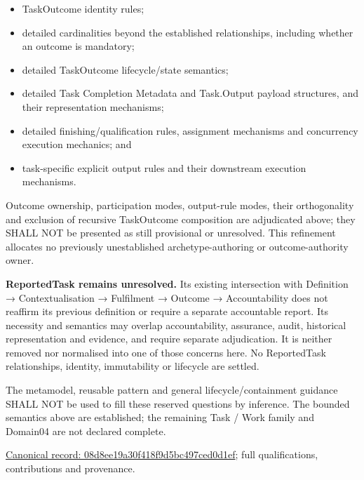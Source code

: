 \begin{itemize}


\item TaskOutcome identity rules;

\item detailed cardinalities beyond the established relationships, including
  whether an outcome is mandatory;

\item detailed TaskOutcome lifecycle/state semantics;

\item detailed Task Completion Metadata and Task.Output payload structures, and
  their representation mechanisms;

\item detailed finishing/qualification rules, assignment mechanisms and
  concurrency execution mechanics; and

\item task-specific explicit output rules and their downstream execution
  mechanisms.

\end{itemize}


Outcome ownership, participation modes, output-rule modes, their orthogonality
and exclusion of recursive TaskOutcome composition are adjudicated above;
they SHALL NOT be presented as still provisional or unresolved. This
refinement allocates no previously unestablished archetype-authoring or
outcome-authority owner.



\textbf{ReportedTask remains unresolved.} Its existing intersection with
Definition → Contextualisation → Fulfilment → Outcome → Accountability does
not reaffirm its previous definition or require a separate accountable report.
Its necessity and semantics may overlap accountability, assurance, audit,
historical representation and evidence, and require separate adjudication.
It is neither removed nor normalised into one of those concerns here. No
ReportedTask relationships, identity, immutability or lifecycle are settled.



The metamodel, reusable pattern and general lifecycle/containment guidance
SHALL NOT be used to fill these reserved questions by inference. The bounded
semantics above are established; the remaining Task / Work family and Domain04
are not declared complete.


{\footnotesize \href{../../../../continuum/application/data-object/topic/08d8ee19a30f418f9d5bc497ced0d1ef.md}{Canonical record: 08d8ee19a30f418f9d5bc497ced0d1ef}; full qualifications, contributions and provenance.}\par
